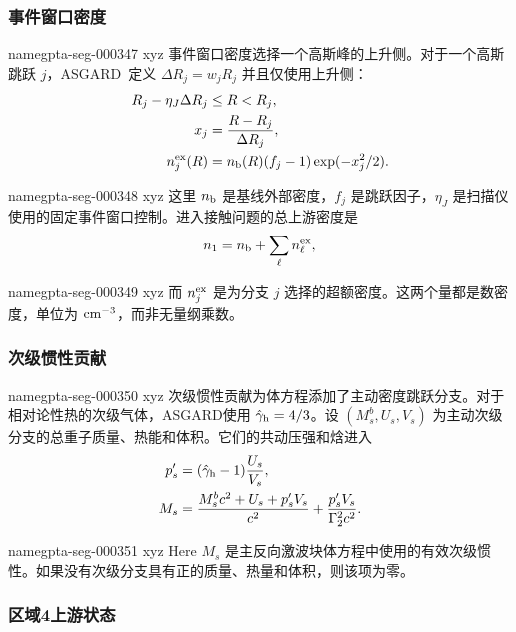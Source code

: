 \documentclass[twocolumn]{aastex702}
\makeatletter
\newcommand{\asgard}{\textsc{ASGARD}}
\providecommand{\gptareaderanchor}[1]{\pdfdest name{#1} xyz}%
\providecommand{\gptareaderanchor}[1]{\special{pdf:dest (#1) [ @thispage /XYZ @xpos @ypos null ]}}%
\makeatother
\begin{document}
\subsubsection{事件窗口密度}


\gptareaderanchor{gpta-seg-000347}%
事件窗口密度选择一个高斯峰的上升侧。对于一个高斯跳跃 \(j\)，\asgard\ 定义 \(\Delta R_j=w_jR_j\) 并且仅使用上升侧：
\begin{equation}
\begin{aligned}
R_j-\eta_J\Delta R_j&\le R<R_j,\\
x_j&=\frac{R-R_j}{\Delta R_j},\\
n_j^{\rm ex}(R)&=n_{\rm b}(R)(f_j-1)\exp(-x_j^2/2).
\end{aligned}
\end{equation}

\gptareaderanchor{gpta-seg-000348}%
这里 \(n_{\rm b}\) 是基线外部密度，\(f_j\) 是跳跃因子，\(\eta_J\) 是扫描仪使用的固定事件窗口控制。进入接触问题的总上游密度是
\begin{equation}
n_1=n_{\rm b}+\sum_{\ell}n_\ell^{\rm ex},
\end{equation}

\gptareaderanchor{gpta-seg-000349}%
而 \(n_j^{\rm ex}\) 是为分支 \(j\) 选择的超额密度。这两个量都是数密度，单位为 \({\rm cm^{-3}}\)，而非无量纲乘数。

\subsubsection{次级惯性贡献}


\gptareaderanchor{gpta-seg-000350}%
次级惯性贡献为体方程添加了主动密度跳跃分支。对于相对论性热的次级气体，\asgard 使用 \(\hat\gamma_{\rm h}=4/3\)。设 \((M_s^b,U_s,V_s)\) 为主动次级分支的总重子质量、热能和体积。它们的共动压强和焓进入
\begin{equation}
\begin{aligned}
p'_s&=(\hat\gamma_{\rm h}-1)\frac{U_s}{V_s},\\
M_s&=\frac{M_s^bc^2+U_s+p'_sV_s}{c^2}
+\frac{p'_sV_s}{\Gamma_2^2c^2}.
\end{aligned}
\end{equation}

\gptareaderanchor{gpta-seg-000351}%
Here \(M_s\) 是主反向激波块体方程中使用的有效次级惯性。如果没有次级分支具有正的质量、热量和体积，则该项为零。

\subsubsection{区域4上游状态}
\end{document}
